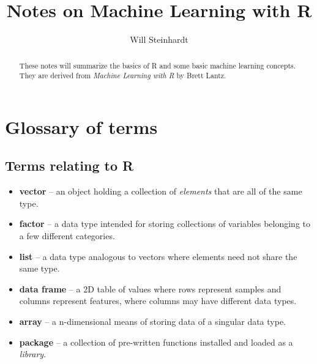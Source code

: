 \documentclass[]{article}
\title{Notes on Machine Learning with R}
\author{Will Steinhardt}
\begin{document}
\newcommand{\code}[1]{\texttt{\detokenize{#1}}}

\maketitle

\begin{abstract}
These notes will summarize the basics of R and some basic machine learning concepts.  They are derived from \emph{Machine Learning with R} by Brett Lantz.
\end{abstract}

\section{Glossary of terms}
\subsection*{Terms relating to R}
\begin{itemize}
	\item \textbf{vector} -- an object holding a collection of \emph{elements} that are all of the same type.
	\item \textbf{factor} -- a data type intended for storing collections of variables belonging to a few different categories.
	\item \textbf{list} -- a data type analogous to vectors where elements need not share the same type.
	\item \textbf{data frame} -- a 2D table of values where rows represent samples and columns represent features, where columns may have different data types.
	\item \textbf{array} -- a n-dimensional means of storing data of a singular data type.
	\item \textbf{package} -- a collection of pre-written functions installed and loaded as a \emph{library}.
\end{itemize}
\end{document}
